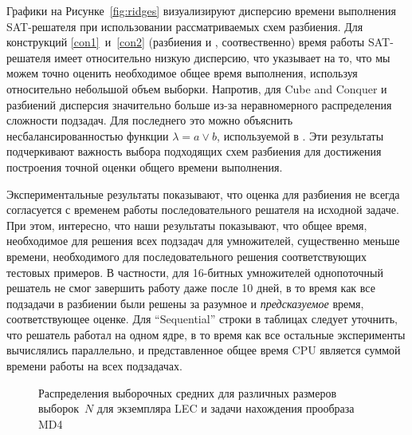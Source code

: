 Графики на Рисунке~\ref{fig:ridges} визуализируют дисперсию времени выполнения SAT-решателя при использовании рассматриваемых схем разбиения.
Для конструкций \ref{con1}~и~\ref{con2} (разбиения  и , соотвественно) время работы SAT-решателя имеет относительно низкую дисперсию, что указывает на то, что мы можем точно оценить необходимое общее время выполнения, используя относительно небольшой объем выборки.
Напротив, для Cube and Conquer и разбиений  дисперсия значительно больше из-за неравномерного распределения сложности подзадач.
Для последнего это можно объяснить несбалансированностью функции $\lambda = a \lor b$, используемой в .
Эти результаты подчеркивают важность выбора подходящих схем разбиения для достижения построения точной оценки общего времени выполнения.

Экспериментальные результаты показывают, что оценка для разбиения не всегда согласуется с временем работы последовательного решателя на исходной задаче.
При этом, интересно, что наши результаты показывают, что общее время, необходимое для решения всех подзадач для умножителей, существенно меньше времени, необходимого для последовательного решения соответствующих тестовых примеров.
В частности, для 16-битных умножителей однопоточный решатель не смог завершить работу даже после 10 дней, в то время как все подзадачи в разбиении были решены за разумное и \emph{предсказуемое} время, соответствующее оценке.
Для \enquote{Sequential} строки в таблицах следует уточнить, что решатель работал на одном ядре, в то время как все остальные эксперименты вычислялись параллельно, и представленное общее время CPU является суммой времени работы на всех подзадачах.

\begin{figure*}[!ht]
    \centering
    \hfill
    \hfill
    \hfill
    \caption{Распределения выборочных средних для различных размеров выборок~$N$ для экземпляра LEC  и задачи нахождения прообраза MD4 }
    \label{fig:min-max-CvK-16-kissat}
\end{figure*}

